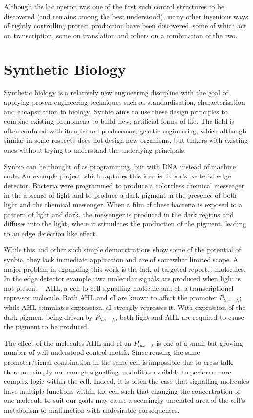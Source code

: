 Although the lac operon was one of the first such control structures to be
discovered (and remains among the best understood), many other ingenious ways
of tightly controlling protein production have been discovered, some of which
act on transcription, some on translation and others on a combination of the
two.

\section{Synthetic Biology}
\label{sec:synbio}

Synthetic biology is a relatively new
engineering discipline with the goal of applying proven engineering techniques
such as standardisation, characterisation and encapsulation to biology.
Synbio aims to use these design principles to combine existing phenomena to 
build new, artificial forms of life.
The field is often confused with its spiritual predecessor, genetic 
engineering, which although similar in some respects does not design new
organisms, but tinkers with existing ones without trying to understand the
underlying principals.

Synbio can be thought of as programming, but with DNA instead of machine
code.
An example project which captures this idea is Tabor's bacterial edge
detector\cite{edgeDetector}.
Bacteria were programmed to produce a colourless chemical messenger in the 
absence of light and to produce a dark pigment in the presence of both light 
and the chemical messenger.
When a film of these bacteria is exposed to a pattern of light and dark, the
messenger is produced in the dark regions and diffuses into the light, where it
stimulates the production of the pigment, 
leading to an edge detection like effect.

While this and other such simple demonstrations show some of the potential 
of synbio, they lack immediate application and are of somewhat limited scope.
A major problem in expanding this work is the lack of targeted reporter
molecules.
In the edge detector example, two molecular signals are produced when light is 
not present -- AHL, a cell-to-cell signalling molecule and cI, a
transcriptional repressor molecule.
Both AHL and cI are known to affect the promoter $P_{lux-\lambda}$; while AHL 
stimulates expression, cI strongly represses it.
With expression of the dark pigment being driven by $P_{lux-\lambda}$, 
both light and AHL are required to cause the pigment to be produced.

The effect of the molecules AHL and cI on $P_{lux-\lambda}$ is one of a small
but growing number of well understood control motifs.
Since reusing the same promoter/signal combination in the same cell is 
impossible due to cross-talk, there are simply not enough signalling modalities 
available to perform more complex logic within the cell.
Indeed, it is often the case that signalling molecules have multiple functions
within the cell such that changing the concentration of one molecule to suit
our goals may cause a seemingly unrelated area of the cell's metabolism to
malfunction with undesirable consequences.

